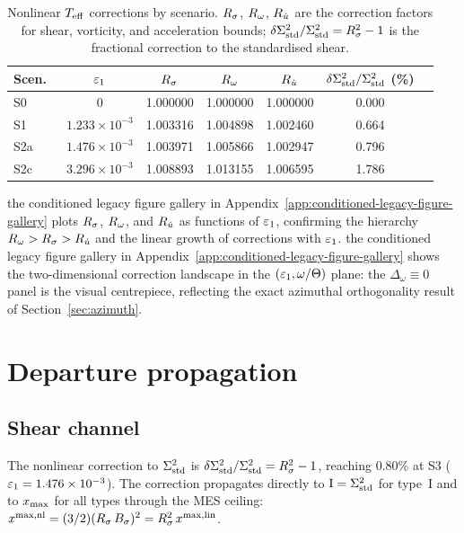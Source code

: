 \begin{table}[ht]
\caption{Nonlinear $T_{\mathrm{eff}}$ corrections by scenario.  $R_\sigma$,
$R_\omega$, $R_{\dot{u}}$ are the correction factors for shear, vorticity,
and acceleration bounds; $\delta\Sigma^2_{\mathrm{std}}/\Sigma^2_{\mathrm{std}} = R_\sigma^2 - 1$
is the fractional correction to the standardised shear.}
\label{tab:nl-corrections}
\centering\footnotesize\setlength{\tabcolsep}{4pt}
\begin{tabular}{lcccccc}
\toprule
Scen.\ & $\varepsilon_1$ & $R_\sigma$ & $R_\omega$ & $R_{\dot{u}}$
  & $\delta\Sigma^2_{\mathrm{std}}/\Sigma^2_{\mathrm{std}}$ (\%) \\
\midrule
S0  & $0$             & 1.000000 & 1.000000 & 1.000000 & 0.000 \\
S1  & $1.233\times10^{-3}$ & 1.003316 & 1.004898 & 1.002460 & 0.664 \\
S2a & $1.476\times10^{-3}$ & 1.003971 & 1.005866 & 1.002947 & 0.796 \\
S2c & $3.296\times10^{-3}$ & 1.008893 & 1.013155 & 1.006595 & 1.786 \\
\bottomrule
\end{tabular}
\end{table}

the conditioned legacy figure gallery in Appendix~\ref{app:conditioned-legacy-figure-gallery} plots $R_\sigma$, $R_\omega$, and
$R_{\dot{u}}$ as functions of $\varepsilon_1$, confirming the hierarchy
$R_\omega > R_\sigma > R_{\dot{u}}$ and the linear growth of corrections with
$\varepsilon_1$.  the conditioned legacy figure gallery in Appendix~\ref{app:conditioned-legacy-figure-gallery} shows the two-dimensional
correction landscape in the $(\varepsilon_1, \omega/\Theta)$ plane: the
$\Delta_\omega \equiv 0$ panel is the visual centrepiece, reflecting
the exact azimuthal orthogonality result of
Section~\ref{sec:azimuth}.


\section{Departure propagation}\label{sec:defect-prop}

\subsection{Shear channel}\label{sec:shear-channel}

The nonlinear correction to $\Sigma^2_{\mathrm{std}}$ is
$\delta\Sigma^2_{\mathrm{std}}/\Sigma^2_{\mathrm{std}} = R_\sigma^2 - 1$, reaching $0.80\%$ at
S3 ($\varepsilon_1 = 1.476 \times 10^{-3}$).  The correction propagates directly to $\mathrm{I} = \Sigma^2_{\mathrm{std}}$ for
type~I and to $x_{\max}$ for all types through the MES ceiling:
$x^{\mathrm{max,nl}} = (3/2)(R_\sigma\,B_\sigma)^2
= R_\sigma^2\,x^{\mathrm{max,lin}}$.


